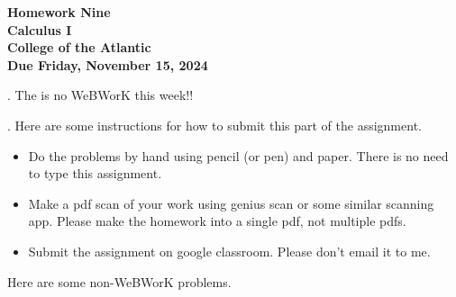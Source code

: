 \documentclass[12pt]{article}
\begin{document}
\pagestyle{empty}
 
\begin{center}
{\LARGE {\bf Homework Nine}}\\
\bigskip
{\Large {\bf Calculus I}}\\
\bigskip
{\Large {\bf College of the Atlantic}}\\
\bigskip
{ {\bf Due Friday, November 15, 2024}}\\ 
\end{center}
\medskip


.
The is no WeBWorK this week!!


.  Here are some
instructions for how to submit this part of the assignment.
\begin{itemize}
  \setlength{\itemsep}{0mm}
\item Do the problems by hand using pencil (or pen) and paper.
  There is no need to type this assignment.
\item Make a pdf scan of your work using genius scan or some
  similar scanning app.  Please make the homework into a single
  pdf, not multiple pdfs.
\item Submit the assignment on google classroom.  Please don't
  email it to me.
\end{itemize}

\noindent Here are some non-WeBWorK problems.
\end{document}
